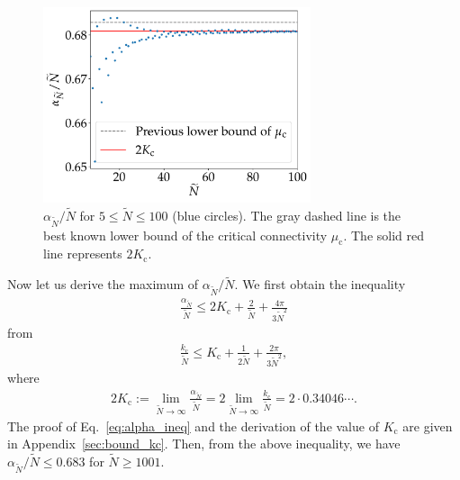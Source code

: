 \begin{figure}[!t]
    \centering
    \includegraphics[width=0.7\textwidth]{figs/sup_m.pdf}
    \caption{
        $\alpha_{\widetilde{N}}/\widetilde{N}$ for $5\leq\widetilde{N}\leq100$ (blue circles). The gray dashed line is the best known lower bound of the critical connectivity $\mu_{\mathrm{c}}$. The solid red line represents $2K_{\mathrm{c}}$.
    }
    \label{fig:sup_m}
\end{figure}

Now let us derive the maximum of $\alpha_{\widetilde{N}}/\widetilde{N}$. We first obtain the inequality
\begin{align}
\frac{\alpha_{\widetilde{N}}}{\widetilde{N}}\leq2K_{\mathrm{c}}+\frac{2}{\widetilde{N}}+\frac{4\pi}{3\widetilde{N}^{2}}
\label{eq:alpha_ineq}
\end{align}
from
\begin{align}
    \frac{k_{\mathrm{c}}}{\widetilde{N}}\leq K_{\mathrm{c}}+\frac{1}{2\widetilde{N}}+\frac{2\pi}{3\widetilde{N}^{2}},
\end{align}
where
\begin{align}
2K_{\mathrm{c}}:=\lim_{\widetilde{N}\to\infty}\frac{\alpha_{\widetilde{N}}}{\widetilde{N}}=2\lim_{\widetilde{N}\to\infty}\frac{k_{\mathrm{c}}}{\widetilde{N}}=2\cdot 0.34046\cdots.
\end{align}
The proof of Eq.~\eqref{eq:alpha_ineq} and the derivation of the value of $ K_{\mathrm{c}}$ are given in Appendix~\ref{sec:bound_kc}. Then, from the above inequality, we have $\alpha_{\widetilde{N}}/\widetilde{N}\leq 0.683$ for $\widetilde{N}\geq1001$.

